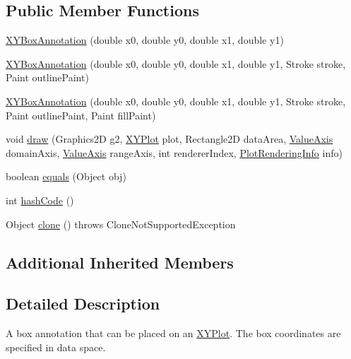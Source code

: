 \subsection*{Public Member Functions}
\begin{DoxyCompactItemize}
\item 
\mbox{\hyperlink{classorg_1_1jfree_1_1chart_1_1annotations_1_1_x_y_box_annotation_a9c83fd2e2f729efcb9abfdc0558a8bb3}{X\+Y\+Box\+Annotation}} (double x0, double y0, double x1, double y1)
\item 
\mbox{\hyperlink{classorg_1_1jfree_1_1chart_1_1annotations_1_1_x_y_box_annotation_a254ee44b1d7f0f507728efe0696c9c02}{X\+Y\+Box\+Annotation}} (double x0, double y0, double x1, double y1, Stroke stroke, Paint outline\+Paint)
\item 
\mbox{\hyperlink{classorg_1_1jfree_1_1chart_1_1annotations_1_1_x_y_box_annotation_a723d28e29d63182fc35edcd96b6654d5}{X\+Y\+Box\+Annotation}} (double x0, double y0, double x1, double y1, Stroke stroke, Paint outline\+Paint, Paint fill\+Paint)
\item 
void \mbox{\hyperlink{classorg_1_1jfree_1_1chart_1_1annotations_1_1_x_y_box_annotation_acb8fab482131052fe874c8d3c5226ebc}{draw}} (Graphics2D g2, \mbox{\hyperlink{classorg_1_1jfree_1_1chart_1_1plot_1_1_x_y_plot}{X\+Y\+Plot}} plot, Rectangle2D data\+Area, \mbox{\hyperlink{classorg_1_1jfree_1_1chart_1_1axis_1_1_value_axis}{Value\+Axis}} domain\+Axis, \mbox{\hyperlink{classorg_1_1jfree_1_1chart_1_1axis_1_1_value_axis}{Value\+Axis}} range\+Axis, int renderer\+Index, \mbox{\hyperlink{classorg_1_1jfree_1_1chart_1_1plot_1_1_plot_rendering_info}{Plot\+Rendering\+Info}} info)
\item 
boolean \mbox{\hyperlink{classorg_1_1jfree_1_1chart_1_1annotations_1_1_x_y_box_annotation_a8a6e8a64d1205c57c869884c0fcbddce}{equals}} (Object obj)
\item 
int \mbox{\hyperlink{classorg_1_1jfree_1_1chart_1_1annotations_1_1_x_y_box_annotation_abaecacf756047c223ba0cda0d1004286}{hash\+Code}} ()
\item 
Object \mbox{\hyperlink{classorg_1_1jfree_1_1chart_1_1annotations_1_1_x_y_box_annotation_aafb0de7e0220ed911f89a7409ce1132a}{clone}} ()  throws Clone\+Not\+Supported\+Exception 
\end{DoxyCompactItemize}
\subsection*{Additional Inherited Members}


\subsection{Detailed Description}
A box annotation that can be placed on an \mbox{\hyperlink{}{X\+Y\+Plot}}. The box coordinates are specified in data space. 

